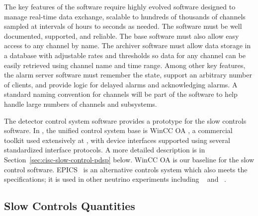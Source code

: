 The key features of the software require highly evolved software designed to manage real-time data exchange, scalable
to hundreds of thousands of channels sampled at intervals of hours to seconds as needed. The software
must be well documented, supported, and reliable. The base
software must also allow easy access to any channel by name. The
archiver software must allow data storage in a database with
adjustable rates and thresholds so data
for any channel can be easily retrieved using channel name and time range. Among other key
features, the alarm server software must remember the state, support an
arbitrary number of clients, and provide logic for delayed alarms and
acknowledging alarms. A standard naming
convention for channels will be part of the software to help handle large
numbers of channels and subsystems.

The  detector control system software \cite{pdspdcs_proc} provides a prototype for %
the  slow controls software.
In , the unified control system base is WinCC OA \cite{winccoa}, a
commercial toolkit used extensively at , with device interfaces
supported using several standardized interface protocols. A more detailed description is in Section~\ref{sec:cisc-slow-control-pdsp} below.
WinCC OA is our baseline for the  slow control software.
EPICS~\cite{epics7} is an alternative controls system which also meets the specifications; it is used in other neutrino experiments including ~\cite{microboone} and ~\cite{Lukhanin:2012fp}. 


\subsection{Slow Controls Quantities}
\label{sec:fdgen-slow-cryo-quant}


